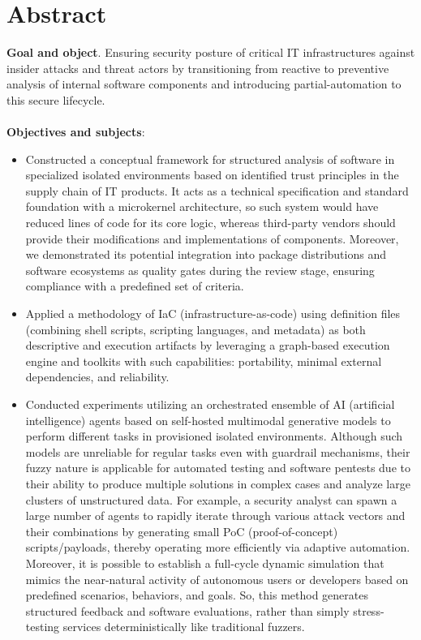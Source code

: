 \chapter{Abstract}
\begin{SingleSpace}

\textbf{Goal and object}. Ensuring security posture of critical IT infrastructures against insider attacks and threat actors by transitioning from reactive to preventive analysis of internal software components and introducing partial-automation to this secure lifecycle.\\\\
\textbf{Objectives and subjects}:
\begin{itemize}
    \item Constructed a conceptual framework for structured analysis of software in specialized isolated environments based on identified trust principles in the supply chain of IT products. It acts as a technical specification and standard foundation with a microkernel architecture, so such system would have reduced lines of code for its core logic, whereas third-party vendors should provide their modifications and implementations of components. Moreover, we demonstrated its potential integration into package distributions and software ecosystems as quality gates during the review stage, ensuring compliance with a predefined set of criteria.
    \item Applied a methodology of IaC (infrastructure-as-code) using definition files (combining shell scripts, scripting languages, and metadata) as both descriptive and execution artifacts by leveraging a graph-based execution engine and toolkits with such capabilities: portability, minimal external dependencies, and reliability.
    \item Conducted experiments utilizing an orchestrated ensemble of AI (artificial intelligence) agents based on self-hosted multimodal generative models to perform different tasks in provisioned isolated environments. Although such models are unreliable for regular tasks even with guardrail mechanisms, their fuzzy nature is applicable for automated testing and software pentests due to their ability to produce multiple solutions in complex cases and analyze large clusters of unstructured data. For example, a security analyst can spawn a large number of agents to rapidly iterate through various attack vectors and their combinations by generating small PoC (proof-of-concept) scripts/payloads, thereby operating more efficiently via adaptive automation. Moreover, it is possible to establish a full-cycle dynamic simulation that mimics the near-natural activity of autonomous users or developers based on predefined scenarios, behaviors, and goals. So, this method generates structured feedback and software evaluations, rather than simply stress-testing services deterministically like traditional fuzzers.

\end{itemize}
\end{SingleSpace}
